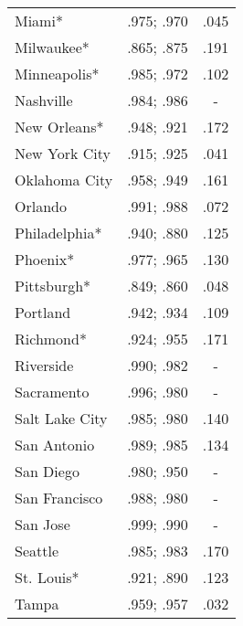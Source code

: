 \documentclass[12pt,titlepage]{article}
\begin{document}
\begin{center}
\begin{longtable}{| l | c |  c|}
Miami*	         & .975;  .970	 & .045 \\
Milwaukee*	 & .865;  .875	 & .191 \\
Minneapolis*	 & .985;  .972	 & .102 \\
Nashville	 & .984;  .986	 & - \\
New Orleans*	 & .948;  .921	 & .172 \\
New York City	 & .915;  .925	 & .041 \\
Oklahoma City	 & .958;  .949	 & .161 \\
Orlando	         & .991;  .988	 & .072 \\
Philadelphia*	 & .940;  .880	 & .125 \\
Phoenix*	 & .977;  .965	 & .130 \\
Pittsburgh*	 & .849;  .860	 & .048 \\
Portland	 & .942;  .934	 & .109 \\
Richmond*	 & .924;  .955	 & .171 \\
Riverside	 & .990;  .982	 & - \\
Sacramento	 & .996;  .980	 & - \\
Salt Lake City	 & .985;  .980	 & .140 \\
San Antonio	 & .989;  .985	 & .134 \\
San Diego	 & .980;  .950	 & - \\
San Francisco	 & .988;  .980	 & - \\
San Jose	 & .999;  .990	 & - \\
Seattle	         & .985;  .983	 & .170 \\
St.  Louis*	 & .921;  .890	 & .123 \\
Tampa	         & .959;  .957	 & .032 \\
\end{longtable}
\end{center}
\end{document}
